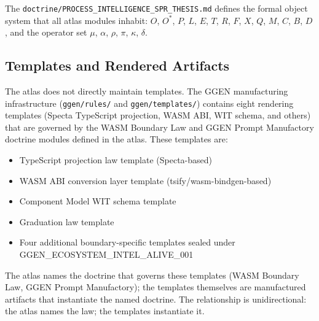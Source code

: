 The \texttt{doctrine/PROCESS\_INTELLIGENCE\_SPR\_THESIS.md} defines the formal
object system that all atlas modules inhabit: $O$, $O^*$, $P$, $L$, $E$, $T$,
$R$, $F$, $X$, $Q$, $M$, $C$, $B$, $D$, and the operator set $\mu$, $\alpha$,
$\rho$, $\pi$, $\kappa$, $\delta$.

\subsection{Templates and Rendered Artifacts}
\label{sec:atlas-impl-templates}

The atlas does not directly maintain templates. The GGEN manufacturing
infrastructure (\texttt{ggen/rules/} and \texttt{ggen/templates/}) contains
eight rendering templates (Specta TypeScript projection, WASM ABI, WIT schema,
and others) that are governed by the WASM Boundary Law and GGEN Prompt
Manufactory doctrine modules defined in the atlas. These templates are:

\begin{itemize}
  \item TypeScript projection law template (Specta-based)
  \item WASM ABI conversion layer template (tsify/wasm-bindgen-based)
  \item Component Model WIT schema template
  \item Graduation law template
  \item Four additional boundary-specific templates sealed under
        GGEN\_ECOSYSTEM\_INTEL\_ALIVE\_001
\end{itemize}

The atlas names the doctrine that governs these templates (WASM Boundary Law,
GGEN Prompt Manufactory); the templates themselves are manufactured artifacts
that instantiate the named doctrine. The relationship is unidirectional: the
atlas names the law; the templates instantiate it.
